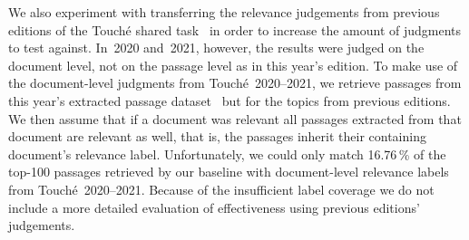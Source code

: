We also experiment with transferring the relevance judgements from previous editions of the Touché shared task~\cite{BondarenkoFBGAPBSWPH2020,BondarenkoGFBAPBSWPH2021} in order to increase the amount of judgments to test against.
In~2020 and~2021, however, the results were judged on the document level, not on the passage level as in this year's edition.
To make use of the document-level judgments from Touché~2020--2021, we retrieve passages from this year's extracted passage dataset~\cite{BondarenkoFKSGBPBSWPH2022} but for the topics from previous editions.
We then assume that if a document was relevant all passages extracted from that document are relevant as well, that is, the passages inherit their containing document's relevance label.
Unfortunately, we could only match 16.76\,\% of the top-100 passages retrieved by our baseline with document-level relevance labels from Touché~2020--2021.
Because of the insufficient label coverage we do not include a more detailed evaluation of effectiveness using previous editions' judgements.
